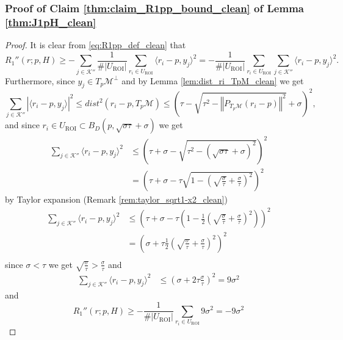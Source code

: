 \documentclass[12pt]{article}
\theoremstyle{remark}
\newcommand{\MM}{\mathcal{M}}
\newcommand{\KK}{\mathcal{K}}
\newcommand{\abs}[1]{\left\vert #1 \right\vert}
\newcommand{\norm}[1]{\left\Vert #1 \right\Vert}
\newcommand{\lrangle}[1]{\langle #1 \rangle}
\newcommand{\lrbrackets}[1]{\left( #1 \right)}
\begin{document}
\begin{appendices}
\subsubsection{Proof of Claim \ref{thm:claim_R1pp_bound_clean} of  Lemma \ref{thm:J1pH_clean}}\label{sec:proof_claim_R1pp_bound_clean}
\begin{proof} 
It is clear from \eqref{eq:R1pp_def_clean} that
\[
R_1''(r; p, H) \geq
- \sum\limits_{j\in\KK''} \frac{1}{\#|U_\textrm{ROI}|}\sum\limits_{r_i\in U_\textrm{ROI}}   \langle r_i - p, {y}_j \rangle^2 =  - \frac{1}{\#|U_\textrm{ROI}|}\sum\limits_{r_i\in U_\textrm{ROI}}\sum\limits_{j\in\KK''}\langle r_i - p, {y}_j \rangle^2
.\]
Furthermore, since $y_j\in T_p\MM^\perp$ and by Lemma \ref{lem:dist_ri_TpM_clean} we get 
\[
\sum\limits_{j\in\KK''}\abs{\lrangle{r_i - p, y_j}}^2 \leq dist^2(r_i - p, T_p\MM) \leq \left(\tau - \sqrt{\tau^2 - \norm{P_{T_p\MM}(r_i- p) }^2} + \sigma\right)^2 
,\]
and since $r_i\in U_\textrm{ROI} \subset B_D(p, \sqrt{\sigma\tau} + \sigma)$ we get
\begin{align*}
     \sum\limits_{j\in\KK''}\langle r_i - p,y_j \rangle^2 
     & \leq 
	\left(\tau+\sigma-\sqrt{\tau^2-(\sqrt{\sigma\tau}+\sigma)^2}\right)^2 \\
	& = \lrbrackets{\tau + \sigma - \tau\sqrt{1 - \lrbrackets{\sqrt{\frac{\sigma}{\tau}} + \frac{\sigma}{\tau} }^2 }}^2
\end{align*}
by Taylor expansion (Remark \ref{rem:taylor_sqrt1-x2_clean})
\begin{align*}
     \sum\limits_{j\in\KK''}\langle r_i - p,y_j \rangle^2 
	& \leq 
	\lrbrackets{\tau + \sigma - \tau\lrbrackets{1 - \frac{1}{2}\lrbrackets{\sqrt{\frac{\sigma}{\tau}} + \frac{\sigma}{\tau} }^2}}^2 \\
	&=
	\lrbrackets{\sigma + \tau \frac{1}{2}\lrbrackets{\sqrt{\frac{\sigma}{\tau}} + \frac{\sigma}{\tau} }^2}^2 \\
\end{align*} 
since $ \sigma < \tau $ we get $\sqrt{\frac{\sigma}{\tau}} > \frac{\sigma}{\tau} $ and
\begin{align}\label{eq:ri_yk_bound_s_square_clean}
     \sum\limits_{j\in\KK''}\langle r_i - p,y_j \rangle^2 
	& \leq 
	\lrbrackets{\sigma + 2\tau \frac{\sigma}{\tau}}^2 = 9 \sigma^2
\end{align}
and
\begin{equation*}
R_1''(r; p, H) \geq
-  \frac{1}{\#|U_\textrm{ROI}|}\sum\limits_{r_i\in U_\textrm{ROI}}   9 \sigma^2 =  -9 \sigma^2
\end{equation*}


\end{proof}
\end{appendices}
\end{document}

